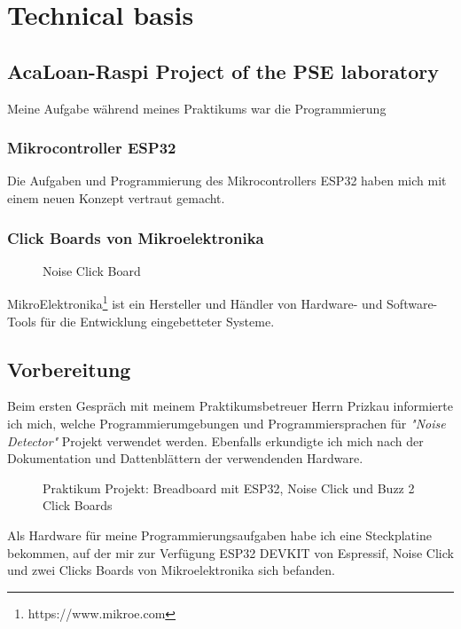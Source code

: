 \chapter{Technical basis}
\label{sec:main}
\section{AcaLoan-Raspi Project of the PSE laboratory}
\label{sec:main:overview}
Meine Aufgabe während meines Praktikums war die Programmierung 

\subsection{Mikrocontroller ESP32}
Die Aufgaben und Programmierung des Mikrocontrollers ESP32 haben mich mit einem neuen Konzept vertraut gemacht.

\subsection{Click Boards von Mikroelektronika}
\begin{wrapfigure}{l}{0.4\textwidth}
	\centering
	\caption{Noise Click Board}
	\label{fig:click}
\end{wrapfigure}
MikroElektronika\footnote{https://www.mikroe.com} ist ein Hersteller und Händler von Hardware- und Software-Tools für die Entwicklung eingebetteter Systeme. 

\section{Vorbereitung}
\label{sec:main:preparation}
Beim ersten Gespräch mit meinem Praktikumsbetreuer Herrn Prizkau informierte ich mich, welche Programmierumgebungen und Programmiersprachen für \textit{"Noise Detector"} Projekt verwendet werden.
Ebenfalls erkundigte ich mich nach der Dokumentation und Dattenblättern der verwendenden Hardware.
\begin{figure}[!hb]
	\centering
	\caption[Praktikum Projekt]{Praktikum Projekt: Breadboard mit ESP32, Noise Click und Buzz 2 Click Boards}
	\label{fig:breadboard}
\end{figure}
Als Hardware für meine Programmierungsaufgaben habe ich eine Steckplatine bekommen, auf der mir zur Verfügung ESP32 DEVKIT von Espressif, Noise Click und zwei Clicks Boards von Mikroelektronika sich befanden.

